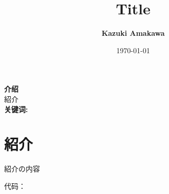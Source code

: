 \documentclass[UTF8]{ctexart}
\title{Title}
\author{\textbf{Kazuki Amakawa}}
\date{\today}
\theoremstyle{plain}
\begin{document}
\maketitle
\noindent \textbf{介绍}\\
紹介\\

\noindent \textbf{关键词:} \\[20ex]
\thispagestyle{empty}
\newpage
\tableofcontents
\thispagestyle{empty}
\newpage
\setcounter{page}{1}
\newpage
\section{紹介}
紹介の内容



\newpage
\medskip



\noindent 代码：\texttt{$$}\\
\end{document}
